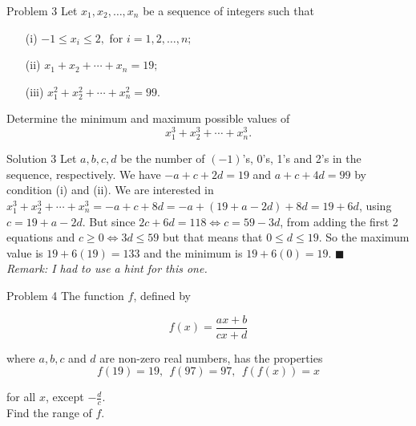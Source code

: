 \documentclass{article}
\begin{document}
\begin{problem}{Problem 3}
Let \( x_1, x_2, \ldots, x_n \) be a sequence of integers such that
\begin{enumerate}
    \item[(i)] \(-1 \leq x_i \leq 2,\) for \(i = 1, 2, \ldots, n;\)
    \item[(ii)] \(x_1 + x_2 + \cdots + x_n = 19;\)
    \item[(iii)] \(x_1^2 + x_2^2 + \cdots + x_n^2 = 99.\)
\end{enumerate}

Determine the minimum and maximum possible values of
\[
x_1^3 + x_2^3 + \cdots + x_n^3.
\]
\end{problem}

\begin{solution}{Solution 3}
Let $a,b,c,d$ be the number of $(-1)$'s, 0's, 1's and 2's in the sequence,
respectively. We have $-a + c + 2d = 19$ and $a + c + 4d = 99$ by condition
(i) and (ii). We are interested in $x_1^3 + x_2^3 + \cdots + x_n^3 =
-a + c + 8d = -a + (19 + a - 2d) + 8d = 19 + 6d$, using $c = 19 + a - 2d$.
But since $2c + 6d = 118 \iff c = 59 - 3d$, from adding the first 2
equations and $c\geq 0 \iff 3d \leq 59$ but that means that
$0\leq d\leq 19$. So the maximum value is $19 + 6(19) = 133$ and the
minimum is $19 + 6(0) = 19$. $\blacksquare$ \\

\textit{Remark: I had to use a hint for this one.}
\end{solution}

\vspace{0.2cm}

\begin{problem}{Problem 4}
The function $f$, defined by

$$
f(x) = \frac{ax+b}{cx+d}
$$

where $a,b,c$ and $d$ are non-zero real numbers, has the properties
$$
f(19) = 19, \ \ f(97) = 97, \ \  f(f(x)) = x
$$

for all $x$, except $-\frac{d}{c}$.\\

Find the range of $f$.
\end{problem}
\end{document}
